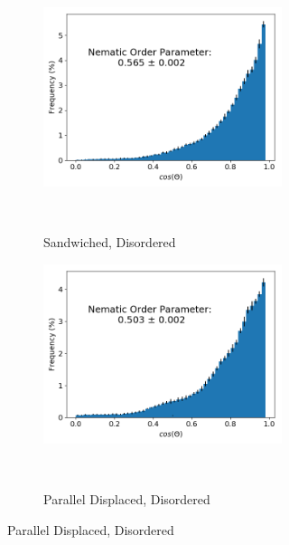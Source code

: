 \documentclass{article}
\begin{document}
\begin{figure}[ht]
\begin{subfigure}{\linewidth}
\begin{subfigure}{0.45\linewidth}
        \end{subfigure}
        \begin{subfigure}{0.45\linewidth}
                \centering
                \includegraphics[width=\linewidth]{disorder_sandwich_nematic_order.png}
                \caption{Sandwiched, Disordered}~\label{fig:disorder_sandwich_nematic}
        \end{subfigure}%
        \begin{subfigure}{0.45\linewidth}
                \centering
                \includegraphics[width=\linewidth]{disorder_offset_nematic_order.png}
                \caption{Parallel Displaced, Disordered}~\label{fig:disorder_offset_nematic}
        \end{subfigure}

  \end{subfigure}
  \caption{}~\label{fig:nematic_distribution}
  \end{figure}
\end{document}
